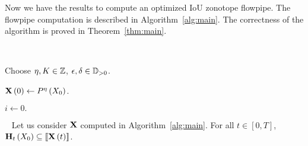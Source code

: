 Now we have the results to compute an optimized IoU zonotope flowpipe.
The flowpipe computation is described in Algorithm~\ref{alg:main}.
The correctness of the algorithm is proved in Theorem~\ref{thm:main}.
%
\begin{algorithm}~\label{alg:main}


Choose $\eta,K\in\mathbb{Z}$, $\epsilon,\delta\in\mathbb{D}_{>0}$.

$\mathbf{X}\left(0\right)\gets P^{\eta}\left(X_0\right)$.

$i\gets 0.$

\end{algorithm}
%
\begin{theorem}~\label{thm:main}
Let us consider $\mathbf{X}$ computed in Algorithm~\ref{alg:main}.  For
all $t\in[0,T]$, $\mathbf{H}_{t}\left(X_0\right)\subseteq \left\llbracket{\mathbf{X}\left(t\right)}\right\rrbracket$.
\end{theorem}
%
